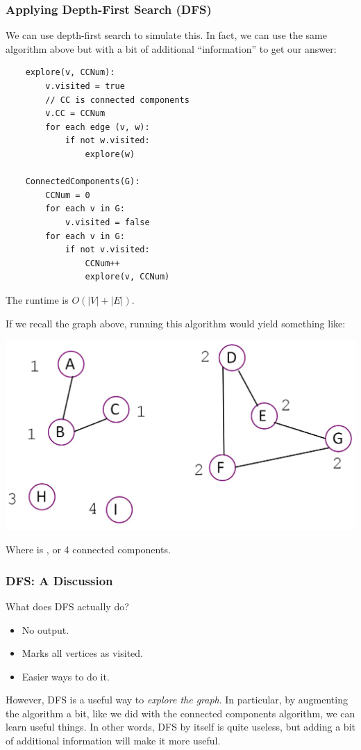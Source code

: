 \documentclass[letterpaper]{article}
\begin{document}
\subsubsection{Applying Depth-First Search (DFS)}
We can use depth-first search to simulate this. In fact, we can use the same algorithm above but with a bit of additional ``information'' to get our answer:
\begin{verbatim}
    explore(v, CCNum):
        v.visited = true 
        // CC is connected components
        v.CC = CCNum 
        for each edge (v, w):
            if not w.visited: 
                explore(w)

    ConnectedComponents(G):
        CCNum = 0
        for each v in G:
            v.visited = false
        for each v in G: 
            if not v.visited: 
                CCNum++
                explore(v, CCNum)
\end{verbatim}
The runtime is $O(|V| + |E|)$. 

\bigskip

If we recall the graph above, running this algorithm would yield something like:
\begin{center}
    \includegraphics[scale=0.35]{assets/graph_con_3.png}
\end{center}
Where  is , or 4 connected components. 


\subsubsection{DFS: A Discussion}
What does DFS actually do? 
\begin{itemize}
    \item No output.
    \item Marks all vertices as visited. 
    \item Easier ways to do it.
\end{itemize}
However, DFS is a useful way to \emph{explore the graph}. In particular, by augmenting the algorithm a bit, like we did with the connected components algorithm, we can learn useful things. In other words, DFS by itself is quite useless, but adding a bit of additional information will make it more useful. 
\end{document}

